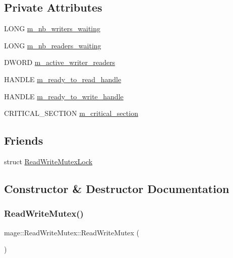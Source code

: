 \subsection*{Private Attributes}
\begin{DoxyCompactItemize}
\item 
L\+O\+NG \hyperlink{classmage_1_1_read_write_mutex_a003313794a9b43f80bd9b258b039438d}{m\+\_\+nb\+\_\+writers\+\_\+waiting}
\item 
L\+O\+NG \hyperlink{classmage_1_1_read_write_mutex_acbe7553fff7cca2656f6f2b8f0471484}{m\+\_\+nb\+\_\+readers\+\_\+waiting}
\item 
D\+W\+O\+RD \hyperlink{classmage_1_1_read_write_mutex_a1e0ad98e517236170faae5b27decfdce}{m\+\_\+active\+\_\+writer\+\_\+readers}
\item 
H\+A\+N\+D\+LE \hyperlink{classmage_1_1_read_write_mutex_a65c0ef8b687d48104b09a9d175e72236}{m\+\_\+ready\+\_\+to\+\_\+read\+\_\+handle}
\item 
H\+A\+N\+D\+LE \hyperlink{classmage_1_1_read_write_mutex_a9498ef85b52486342ba657f34369f89e}{m\+\_\+ready\+\_\+to\+\_\+write\+\_\+handle}
\item 
C\+R\+I\+T\+I\+C\+A\+L\+\_\+\+S\+E\+C\+T\+I\+ON \hyperlink{classmage_1_1_read_write_mutex_a77fe51b87e5205d60ea045fa53bc1fa3}{m\+\_\+critical\+\_\+section}
\end{DoxyCompactItemize}
\subsection*{Friends}
\begin{DoxyCompactItemize}
\item 
struct \hyperlink{classmage_1_1_read_write_mutex_a7ae207fc659160d3c55a5ba1468007f7}{Read\+Write\+Mutex\+Lock}
\end{DoxyCompactItemize}


\subsection{Constructor \& Destructor Documentation}
\hypertarget{classmage_1_1_read_write_mutex_aae10694de3862f2d1059477169883940}{}\label{classmage_1_1_read_write_mutex_aae10694de3862f2d1059477169883940} 
\subsubsection{\texorpdfstring{Read\+Write\+Mutex()}{ReadWriteMutex()}\hspace{0.1cm}{\footnotesize\ttfamily [1/2]}}
{\footnotesize\ttfamily mage\+::\+Read\+Write\+Mutex\+::\+Read\+Write\+Mutex (\begin{DoxyParamCaption}{ }\end{DoxyParamCaption})\hspace{0.3cm}{\ttfamily [private]}}

